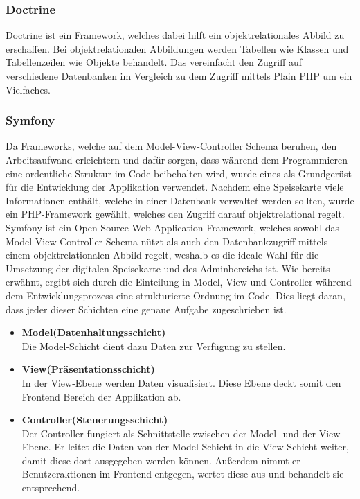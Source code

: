     \subsubsection{Doctrine}

Doctrine ist ein Framework, welches dabei hilft ein objektrelationales Abbild zu erschaffen. Bei objektrelationalen Abbildungen werden Tabellen wie Klassen und Tabellenzeilen wie Objekte behandelt. Das vereinfacht den Zugriff auf verschiedene Datenbanken im Vergleich zu dem Zugriff mittels Plain PHP um ein Vielfaches.

    \subsubsection{Symfony}

Da Frameworks, welche auf dem Model-View-Controller Schema beruhen, den Arbeitsaufwand erleichtern und dafür sorgen, dass während dem Programmieren eine ordentliche Struktur im Code beibehalten wird, wurde eines als Grundgerüst für die Entwicklung der Applikation verwendet. Nachdem eine Speisekarte viele Informationen enthält, welche in einer Datenbank verwaltet werden sollten, wurde ein PHP-Framework gewählt, welches den Zugriff darauf objektrelational regelt.
Symfony ist ein Open Source Web Application Framework, welches sowohl das Model-View-Controller Schema nützt als auch den Datenbankzugriff mittels einem objektrelationalen Abbild regelt, weshalb es die ideale Wahl für die Umsetzung der digitalen Speisekarte und des Adminbereichs ist. 
Wie bereits erwähnt, ergibt sich durch die Einteilung in Model, View und Controller während dem Entwicklungsprozess eine strukturierte Ordnung im Code.
Dies liegt daran, dass jeder dieser Schichten eine genaue Aufgabe zugeschrieben ist.
\begin{itemize}
    \item \textbf{Model(Datenhaltungsschicht)}\\
Die Model-Schicht dient dazu Daten zur Verfügung zu stellen. 
    \item \textbf{View(Präsentationsschicht)}\\
In der View-Ebene werden Daten visualisiert. Diese Ebene deckt somit den Frontend Bereich der Applikation ab.
    \item \textbf{Controller(Steuerungsschicht)}\\ 
Der Controller fungiert als Schnittstelle zwischen der Model- und der View-Ebene. Er leitet die Daten von der Model-Schicht in die View-Schicht weiter, damit diese dort ausgegeben werden können. Außerdem nimmt er Benutzeraktionen im Frontend entgegen, wertet diese aus und behandelt sie entsprechend.
  \end{itemize}  
